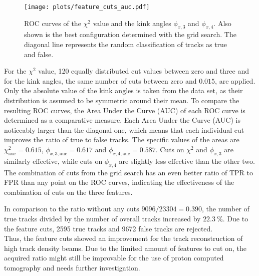 \begin{figure}[H]
  \centering
  \texttt{[image: plots/feature\_cuts\_auc.pdf]}
  \caption{ROC curves of the $\chi^2$ value and the kink angles $\phi_{x,3}$ and $\phi_{x,4}$. Also shown is the best configuration determined with the grid search. The diagonal
  line represents the random classification of tracks as true and false.}
  \label{fig:feature_grid}
\end{figure}

For the $\chi^2$ value, 120 equally distributed cut values between zero and three and for the kink angles, the same number of cuts between
zero and $0.015$, are applied. Only the absolute value of the
kink angles is taken from the data set, as their distribution is assumed to be symmetric around their mean. To compare the resulting ROC curves, the Area Under the Curve (AUC)
of each ROC curve is determined as a comparative measure.
Each Area Under the Curve (AUC) is noticeably larger than the diagonal
one, which means that each individual cut improves the ratio of true to false tracks. The specific values of the areas are $\chi^2_{\text{auc}} = 0.615$,
$\phi_{x,3,\text{auc}} = 0.617$ and $\phi_{x,4,\text{auc}} = 0.587$. Cuts on $\chi^2$ and $\phi_{x,3}$ are similarly effective, while cuts on $\phi_{x,4}$ are slightly
less effective than the other two. The combination of cuts from the grid search has an even better ratio of TPR to FPR than any point on the ROC curves, indicating the
effectiveness of the combination of cuts on the three features.

In comparison to the ratio without any cuts $9096/23304 = 0.390$, the number of true tracks divided by the number of overall tracks increased by $\SI{22.3}{\percent}$. Due to
the feature cuts, 2595 true tracks and 9672 false tracks are rejected. \\
Thus, the feature cuts showed an improvement for the track reconstruction of high track density beams. Due to the limited amount of features to cut on, the acquired ratio
might still be improvable for the use of proton computed tomography and needs further investigation.
